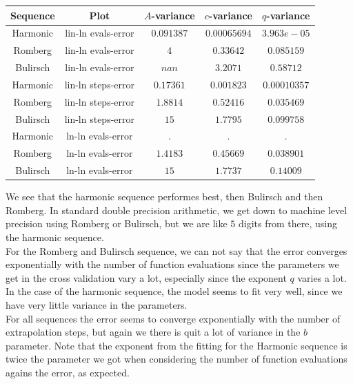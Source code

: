 \begin{table}[H]
    \centering
    \begin{tabular}{c|c||c|c|c}
Sequence & Plot & \(A\)-variance & \(c\)-variance & \(q\)-variance\\\hline
Harmonic & lin-ln evals-error & \(0.091387\) & \(0.00065694\) & \(3.963e-05\) \\
Romberg & lin-ln evals-error & \(4\) & \(0.33642\) & \(0.085159\) \\
Bulirsch & lin-ln evals-error & \(nan\) & \(3.2071\) & \(0.58712\) \\
Harmonic & lin-ln steps-error & \(0.17361\) & \(0.001823\) & \(0.00010357\) \\
Romberg & lin-ln steps-error & \(1.8814\) & \(0.52416\) & \(0.035469\) \\
Bulirsch & lin-ln steps-error & \(15\) & \(1.7795\) & \(0.099758\) \\
Harmonic & ln-ln evals-error & . & . & . \\
Romberg & ln-ln evals-error & \(1.4183\) & \(0.45669\) & \(0.038901\) \\
Bulirsch & ln-ln evals-error & \(15\) & \(1.7737\) & \(0.14009\) \\
    \end{tabular}
    \label{tab:my_label}
\end{table}

We see that the harmonic sequence performes best, then Bulirsch and then Romberg. In standard double precision arithmetic, we get down to machine level precision using Romberg or Bulirsch, but we are like \(5\) digits from there, using the harmonic sequence.\\

For the Romberg and Bulirsch sequence, we can not say that the error converges exponentially with the number of function evaluations since the parameters we get in the cross validation vary a lot, especially since the exponent \(q\) varies a lot. In the case of the harmonic sequence, the model seems to fit very well, since we have very little variance in the parameters.\\

For all sequences the error seems to converge exponentially with the number of extrapolation steps, but again we there is quit a lot of variance in the \(b\) parameter. Note that the exponent from the fitting for the Harmonic sequence is twice the parameter we got when considering the number of function evaluations agains the error, as expected.\\

